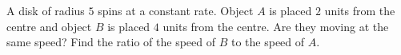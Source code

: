 A disk of radius $5$ spins at a constant rate. Object $A$ is placed $2$ units from the centre and object $B$ is placed $4$ units from the centre. Are they moving at the same speed? Find the ratio of the speed of $B$ to the speed of $A$.
